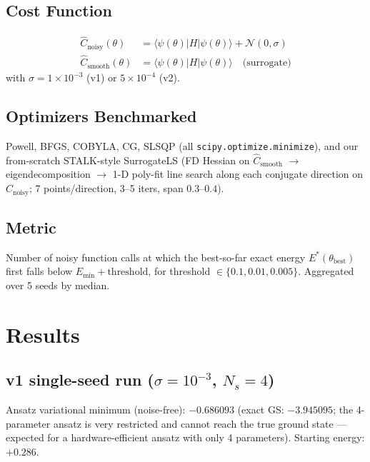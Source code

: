 \documentclass[11pt]{article}
\begin{document}
\subsection{Cost Function}
\begin{align}
\hat C_{\text{noisy}}(\theta) &= \langle\psi(\theta)|H|\psi(\theta)\rangle + \mathcal{N}(0,\sigma) \\
\hat C_{\text{smooth}}(\theta) &= \langle\psi(\theta)|H|\psi(\theta)\rangle \quad \text{(surrogate)}
\end{align}
with $\sigma = 1\times 10^{-3}$ (v1) or $5\times 10^{-4}$ (v2).

\subsection{Optimizers Benchmarked}

Powell, BFGS, COBYLA, CG, SLSQP (all \texttt{scipy.optimize.minimize}), and our
from-scratch STALK-style SurrogateLS (FD Hessian on $\hat C_{\text{smooth}}$ $\to$
eigendecomposition $\to$ 1-D poly-fit line search along each conjugate direction on
$\hat C_{\text{noisy}}$; 7 points/direction, 3--5 iters, span $0.3$--$0.4$).

\subsection{Metric}

Number of noisy function calls at which the best-so-far exact energy $E^*(\theta_{\text{best}})$
first falls below $E_{\min} + \text{threshold}$, for threshold $\in\{0.1, 0.01, 0.005\}$.
Aggregated over 5 seeds by median.

\section{Results}

\subsection{v1 single-seed run ($\sigma=10^{-3}$, $N_s=4$)}

Ansatz variational minimum (noise-free): $-0.686093$ (exact GS: $-3.945095$; the
4-parameter ansatz is very restricted and cannot reach the true ground state --- expected
for a hardware-efficient ansatz with only 4 parameters). Starting energy: $+0.286$.
\end{document}
